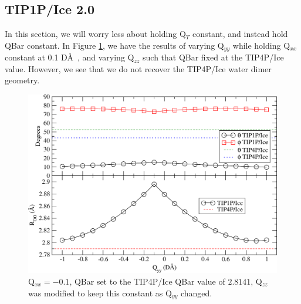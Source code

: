 \subsection{TIP1P/Ice 2.0}




In this section, we will worry less about holding Q$_T$ constant, and instead
hold QBar constant. In Figure \ref{fig:Qyy}, we have the results of varying
Q$_{yy}$ while holding Q$_{xx}$ constant at 0.1 D\AA~, and varying Q$_{zz}$
such that QBar fixed at the TIP4P/Ice value. However, we see that we do
not recover the TIP4P/Ice water dimer geometry.

\begin{figure}[h!]
\includegraphics[width=\linewidth]{Figures/Test19_plot.pdf}
\caption{\label{fig:Qyy} Q$_{xx} = -0.1$, QBar set to the TIP4P/Ice QBar value of $2.8141$, Q$_{zz}$ was modified to keep this constant as Q$_{yy}$ changed.}
\end{figure}

